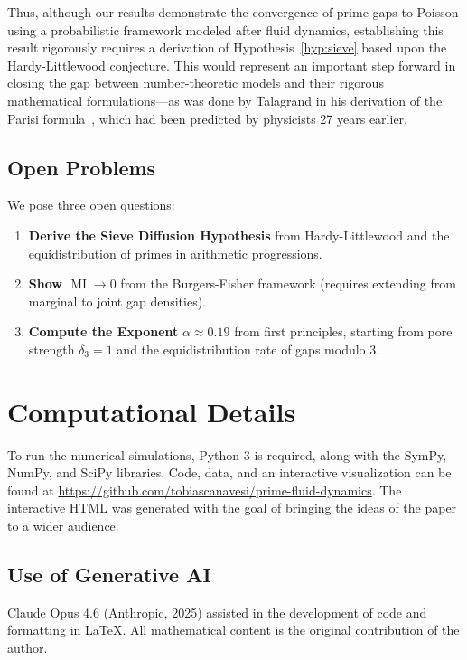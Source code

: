 \documentclass[11pt, a4paper]{amsart}
\theoremstyle{plain}
\theoremstyle{definition}
\newcommand{\MI}{\operatorname{MI}}
\begin{document}
Thus, although our results demonstrate the convergence of prime gaps to Poisson using a probabilistic framework modeled after fluid dynamics, 
establishing this result rigorously requires a derivation of Hypothesis~\ref{hyp:sieve} based upon the Hardy-Littlewood conjecture. 
This would represent an important step forward in closing the gap between number-theoretic models and their rigorous mathematical 
formulations---as was done by Talagrand in his derivation of the Parisi formula~\cite{Talagrand2006}, which had been predicted by physicists 27 years earlier.

\subsection{Open Problems}

We pose three open questions:
\begin{enumerate}
\item \textbf{Derive the Sieve Diffusion Hypothesis} from Hardy-Littlewood and the equidistribution of primes in arithmetic progressions.
\item \textbf{Show $\MI \to 0$} from the Burgers-Fisher framework (requires extending from marginal to joint gap densities).
\item \textbf{Compute the Exponent} $\alpha \approx 0.19$ from first principles, starting from pore strength $\delta_3 = 1$ and the equidistribution rate of gaps modulo $3$.
\end{enumerate}

\section*{Computational Details}

To run the numerical simulations, Python 3 is required, along with the SymPy, NumPy, and SciPy libraries. 
Code, data, and an interactive visualization can be found at \url{https://github.com/tobiascanavesi/prime-fluid-dynamics}. 
The interactive HTML was generated with the goal of bringing the ideas of the paper to a wider audience.

\subsection*{Use of Generative AI}
Claude Opus 4.6 (Anthropic, 2025) assisted in the development of code and formatting in \LaTeX{}. 
All mathematical content is the original contribution of the author.
\end{document}

